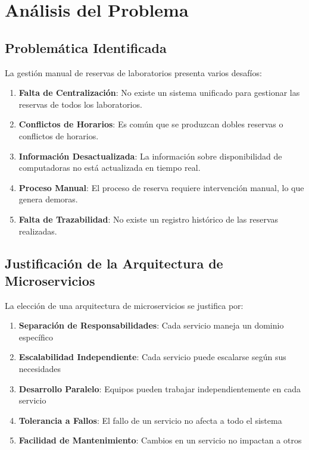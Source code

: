 \documentclass[12pt,a4paper]{article}
\begin{document}
\section{Análisis del Problema}

\subsection{Problemática Identificada}

La gestión manual de reservas de laboratorios presenta varios desafíos:

\begin{enumerate}
    \item \textbf{Falta de Centralización}: No existe un sistema unificado para gestionar las reservas de todos los laboratorios.
    \item \textbf{Conflictos de Horarios}: Es común que se produzcan dobles reservas o conflictos de horarios.
    \item \textbf{Información Desactualizada}: La información sobre disponibilidad de computadoras no está actualizada en tiempo real.
    \item \textbf{Proceso Manual}: El proceso de reserva requiere intervención manual, lo que genera demoras.
    \item \textbf{Falta de Trazabilidad}: No existe un registro histórico de las reservas realizadas.
\end{enumerate}

\subsection{Justificación de la Arquitectura de Microservicios}

La elección de una arquitectura de microservicios se justifica por:

\begin{enumerate}
    \item \textbf{Separación de Responsabilidades}: Cada servicio maneja un dominio específico
    \item \textbf{Escalabilidad Independiente}: Cada servicio puede escalarse según sus necesidades
    \item \textbf{Desarrollo Paralelo}: Equipos pueden trabajar independientemente en cada servicio
    \item \textbf{Tolerancia a Fallos}: El fallo de un servicio no afecta a todo el sistema
    \item \textbf{Facilidad de Mantenimiento}: Cambios en un servicio no impactan a otros
\end{enumerate}
\end{document}
